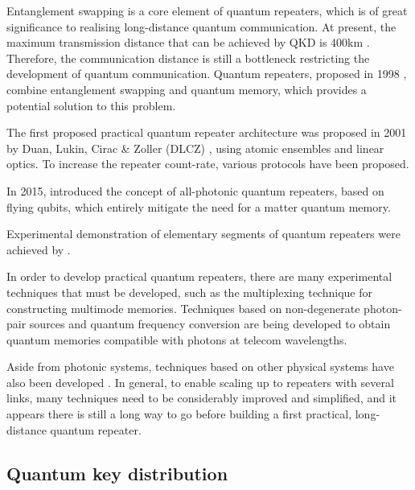\documentclass[aps, rmp, twocolumn, amsmath, amssymb, nofootinbib, superscriptaddress, longbibliography, floatfix, table-of-contents, eqsecnum]{revtex4-1}
\begin{document}
Entanglement swapping is a core element of quantum repeaters, which is of great significance to realising long-distance quantum communication. At present, the maximum transmission distance that can be achieved by QKD is 400km \cite{bib:arxiv_1606.06821}. Therefore, the communication distance is still a bottleneck restricting the development of quantum communication. Quantum repeaters, proposed in 1998 \cite{bib:PRL_81_5932}, combine entanglement swapping and quantum memory, which provides a potential solution to this problem.

The first proposed practical quantum repeater architecture was proposed in 2001 by Duan, Lukin, Cirac \& Zoller (DLCZ) \cite{bib:DLCZ}, using atomic ensembles and linear optics. To increase the repeater count-rate, various protocols \cite{bib:RMP_83_33, bib:PRA_79_042340, bib:PRA_92_012307, bib:PRA_81_052311, bib:PRA_81_052329, bib:NP_6_777, bib:PRL_112_250501} have been proposed.

In 2015, \cite{ncomms7787} introduced the concept of all-photonic quantum repeaters, based on flying qubits, which entirely mitigate the need for a matter quantum memory. 

Experimental demonstration of elementary segments of quantum repeaters were achieved by \cite{bib:Sc_316_1316, bib:Nat_454_1098}.

In order to develop practical quantum repeaters, there are many experimental techniques that must be developed, such as the multiplexing technique \cite{bib:PRA_76_050301, bib:PRA_82_010304, bib:PRL_113_053603, bib:PRL_98_060502} for constructing multimode memories. Techniques based on non-degenerate photon-pair sources \cite{bib:Nat_469_508, bib:Nat_469_512, bib:PRL_112_040504, bib:PRA_92_012329} and quantum frequency conversion \cite{bib:NP_6_894, bib:NC_5_3376} are being developed to obtain quantum memories compatible with photons at telecom wavelengths.

Aside from photonic systems, techniques based on other physical systems have also been developed \cite{bib:NP_11_37, bib:Sc_337_72, bib:N_484_195, bib:N_497_86}. In general, to enable scaling up to repeaters with several links, many techniques need to be considerably improved and simplified, and it appears there is still a long way to go before building a first practical, long-distance quantum repeater.

%
%

\subsection{Quantum key distribution} 
\end{document}
